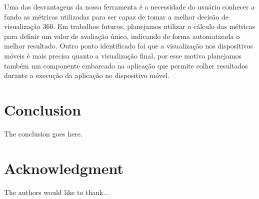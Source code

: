 \documentclass[conference]{IEEEtran}
\begin{document}
Uma das desvantagens da nossa ferramenta é a necessidade do usuário conhecer a fundo as métricas utilizadas para ser capaz de tomar a melhor decisão de visualização 360. Em trabalhos futuros, planejamos utilizar o cálculo das métricas para definir um valor de avaliação único, indicando de forma automatizada o melhor resultado. Outro ponto identificado foi que a visualização nos dispositivos móveis é mais precisa quanto a visualização final, por esse motivo planejamos também um componente embarcado na aplicação que permite colher resultados durante a execução da aplicação no dispositivo móvel.

\section{Conclusion}
The conclusion goes here.






\section*{Acknowledgment}


The authors would like to thank...









% 

% 
%



\end{document}
